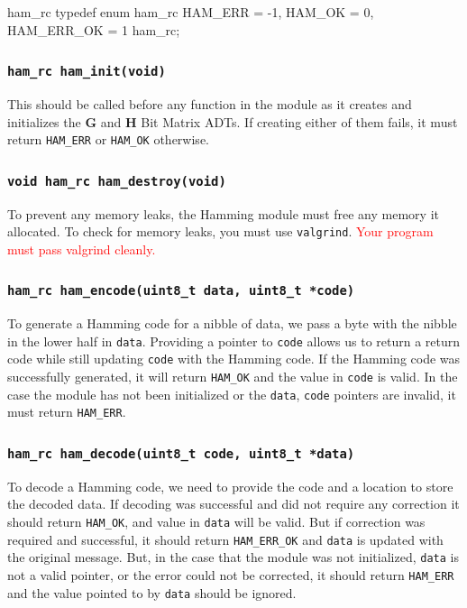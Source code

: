 \documentclass[11pt]{article}
\begin{document}
\begin{codelisting}{ham\_rc}
typedef enum ham_rc {
    HAM_ERR    = -1,
    HAM_OK     = 0,
    HAM_ERR_OK = 1
} ham_rc;
\end{codelisting}

\subsubsection{\texttt{ham\_rc ham\_init(void)}}
This should be called before any function in the module as it creates and initializes 
the $\boldsymbol{G}$ and $\boldsymbol{H}$ Bit Matrix ADTs. If creating either of them
fails, it must return \texttt{HAM\_ERR} or \texttt{HAM\_OK} otherwise.

\subsubsection{\texttt{void ham\_rc ham\_destroy(void)}}
To prevent any memory leaks, the Hamming module must free any memory it allocated.
To check for memory leaks, you must use \texttt{valgrind}.
\textcolor{red}{Your program must pass valgrind cleanly.}

\subsubsection{\texttt{ham\_rc ham\_encode(uint8\_t data, uint8\_t *code)}}
To generate a Hamming code for a nibble of data, we pass a byte with the nibble in the
lower half in \texttt{data}.
Providing a pointer to \texttt{code} allows us to return a return code while still
updating \texttt{code} with the Hamming code. If the Hamming code was successfully
generated, it will return \texttt{HAM\_OK} and the value in \texttt{code} is valid. 
In the case the module has not been initialized or the \texttt{data}, \texttt{code}
pointers are invalid, it must return \texttt{HAM\_ERR}. 

\subsubsection{\texttt{ham\_rc ham\_decode(uint8\_t code, uint8\_t *data)}} \label{ham_dec}
To decode a Hamming code, we need to provide the code and a location to store the decoded data. If
decoding was successful and did not require any correction it should return \texttt{HAM\_OK}, and value
in \texttt{data} will be valid. But if
correction was required and successful, it should return \texttt{HAM\_ERR\_OK} and \texttt{data} is updated
with the original message. But, in the case that
the module was not initialized, \texttt{data} is not a valid pointer, or the error could not be corrected,
it should return \texttt{HAM\_ERR} and the value pointed to by \texttt{data} should be ignored.
\end{document}
